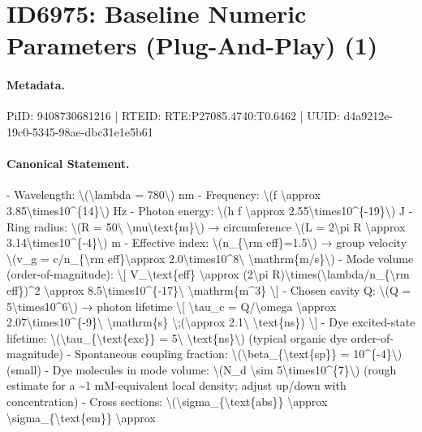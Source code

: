 \section*{ID6975: Baseline Numeric Parameters (Plug-And-Play) (1)}
\paragraph{Metadata.}
PiID: 9408730681216 | RTEID: RTE:P27085.4740:T0.6462 | UUID: d4a9212e-19c0-5345-98ae-dbc31e1e5b61

\paragraph{Canonical Statement.}
- Wavelength: \textbackslash{}(\textbackslash{}lambda = 780\textbackslash{}) nm - Frequency: \textbackslash{}(f \textbackslash{}approx 3.85\textbackslash{}times10\textasciicircum{}\{14\}\textbackslash{}) Hz - Photon energy: \textbackslash{}(h f \textbackslash{}approx 2.55\textbackslash{}times10\textasciicircum{}\{-19\}\textbackslash{}) J - Ring radius: \textbackslash{}(R = 50\textbackslash{} \textbackslash{}mu\textbackslash{}text\{m\}\textbackslash{}) → circumference \textbackslash{}(L = 2\textbackslash{}pi R \textbackslash{}approx 3.14\textbackslash{}times10\textasciicircum{}\{-4\}\textbackslash{}) m - Effective index: \textbackslash{}(n\_\{\textbackslash{}rm eff\}=1.5\textbackslash{}) → group velocity \textbackslash{}(v\_g = c/n\_\{\textbackslash{}rm eff\}\textbackslash{}approx 2.0\textbackslash{}times10\textasciicircum{}8\textbackslash{} \textbackslash{}mathrm\{m/s\}\textbackslash{}) - Mode volume (order-of-magnitude): \textbackslash{}[ V\_\textbackslash{}text\{eff\} \textbackslash{}approx (2\textbackslash{}pi R)\textbackslash{}times(\textbackslash{}lambda/n\_\{\textbackslash{}rm eff\})\textasciicircum{}2 \textbackslash{}approx 8.5\textbackslash{}times10\textasciicircum{}\{-17\}\textbackslash{} \textbackslash{}mathrm\{m\textasciicircum{}3\} \textbackslash{}] - Chosen cavity Q: \textbackslash{}(Q = 5\textbackslash{}times10\textasciicircum{}6\textbackslash{}) → photon lifetime \textbackslash{}[ \textbackslash{}tau\_c = Q/\textbackslash{}omega \textbackslash{}approx 2.07\textbackslash{}times10\textasciicircum{}\{-9\}\textbackslash{} \textbackslash{}mathrm\{s\} \textbackslash{};(\textbackslash{}approx 2.1\textbackslash{} \textbackslash{}text\{ns\}) \textbackslash{}] - Dye excited-state lifetime: \textbackslash{}(\textbackslash{}tau\_\{\textbackslash{}text\{exc\}\} = 5\textbackslash{} \textbackslash{}text\{ns\}\textbackslash{}) (typical organic dye order-of-magnitude) - Spontaneous coupling fraction: \textbackslash{}(\textbackslash{}beta\_\{\textbackslash{}text\{sp\}\} = 10\textasciicircum{}\{-4\}\textbackslash{}) (small) - Dye molecules in mode volume: \textbackslash{}(N\_d \textbackslash{}sim 5\textbackslash{}times10\textasciicircum{}\{7\}\textbackslash{}) (rough estimate for a \textasciitilde{}1 mM-equivalent local density; adjust up/down with concentration) - Cross sections: \textbackslash{}(\textbackslash{}sigma\_\{\textbackslash{}text\{abs\}\} \textbackslash{}approx \textbackslash{}sigma\_\{\textbackslash{}text\{em\}\} \textbackslash{}approx 